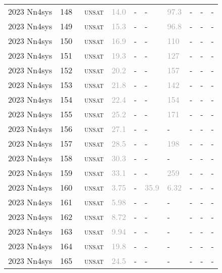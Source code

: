\begin{center}
{\begin{longtable}{@{}llllllllll@{}}
2023 Nn4sys & 148 & ~\textsc{unsat} & \textcolor{darkgray}{14.0} & - & - & \textcolor{darkgray}{97.3} & - & - & - \\
2023 Nn4sys & 149 & ~\textsc{unsat} & \textcolor{darkgray}{15.3} & - & - & \textcolor{darkgray}{96.8} & - & - & - \\
2023 Nn4sys & 150 & ~\textsc{unsat} & \textcolor{darkgray}{16.9} & - & - & \textcolor{darkgray}{110} & - & - & - \\
2023 Nn4sys & 151 & ~\textsc{unsat} & \textcolor{darkgray}{19.3} & - & - & \textcolor{darkgray}{127} & - & - & - \\
2023 Nn4sys & 152 & ~\textsc{unsat} & \textcolor{darkgray}{20.2} & - & - & \textcolor{darkgray}{157} & - & - & - \\
2023 Nn4sys & 153 & ~\textsc{unsat} & \textcolor{darkgray}{21.8} & - & - & \textcolor{darkgray}{142} & - & - & - \\
2023 Nn4sys & 154 & ~\textsc{unsat} & \textcolor{darkgray}{22.4} & - & - & \textcolor{darkgray}{154} & - & - & - \\
2023 Nn4sys & 155 & ~\textsc{unsat} & \textcolor{darkgray}{25.2} & - & - & \textcolor{darkgray}{171} & - & - & - \\
2023 Nn4sys & 156 & ~\textsc{unsat} & \textcolor{darkgray}{27.1} & - & - & - & - & - & - \\
2023 Nn4sys & 157 & ~\textsc{unsat} & \textcolor{darkgray}{28.5} & - & - & \textcolor{darkgray}{198} & - & - & - \\
2023 Nn4sys & 158 & ~\textsc{unsat} & \textcolor{darkgray}{30.3} & - & - & - & - & - & - \\
2023 Nn4sys & 159 & ~\textsc{unsat} & \textcolor{darkgray}{33.1} & - & - & \textcolor{darkgray}{259} & - & - & - \\
2023 Nn4sys & 160 & ~\textsc{unsat} & \textcolor{darkgray}{3.75} & - & \textcolor{darkgray}{35.9} & \textcolor{darkgray}{6.32} & - & - & - \\
2023 Nn4sys & 161 & ~\textsc{unsat} & \textcolor{darkgray}{5.98} & - & - & - & - & - & - \\
2023 Nn4sys & 162 & ~\textsc{unsat} & \textcolor{darkgray}{8.72} & - & - & - & - & - & - \\
2023 Nn4sys & 163 & ~\textsc{unsat} & \textcolor{darkgray}{9.94} & - & - & - & - & - & - \\
2023 Nn4sys & 164 & ~\textsc{unsat} & \textcolor{darkgray}{19.8} & - & - & - & - & - & - \\
2023 Nn4sys & 165 & ~\textsc{unsat} & \textcolor{darkgray}{24.5} & - & - & - & - & - & - \\

\end{longtable}}
\end{center}

